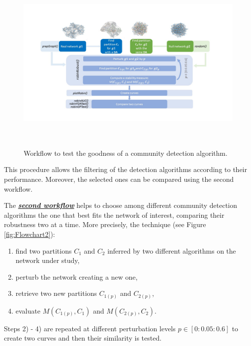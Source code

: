 \begin{figure}[h!]
\centering
\includegraphics[width=.9\textwidth, height=9cm]{Figure1.png}
\caption{\label{fig:Flowchart1} Workflow to test the goodness of a community detection algorithm.}
\end{figure}

This procedure allows the filtering of the detection algorithms according to their performance. Moreover, the selected ones can be compared using the second workflow.\hfill \break



The \textbf{\emph{\underline{second workflow}}} helps to choose among different community detection algorithms the one that best fits the network of interest, comparing their robustness two at a time.
More precisely, the technique (see Figure \ref{fig:Flowchart2}): 
\begin{enumerate}
\item find two partitions $C_1$ and $C_2$ inferred by two different algorithms on the network under study, 
\item perturb the network creating a new one, 
\item retrieve two new partitions $C_{1(p)}$ and $C_{2(p)}$,
\item evaluate $M\left(C_{1\left(p\right)},C_1\right)$  and $M\left(C_{2\left(p\right)},C_2\right)$.  
\end{enumerate}
Steps 2) - 4) are repeated at different perturbation levels $p \in [0:0.05:0.6]$ to create two curves and then their similarity is tested.

